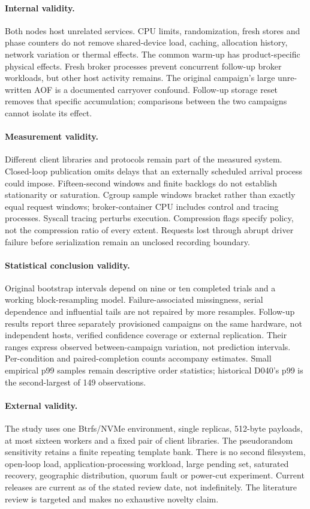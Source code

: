 \documentclass[11pt]{article}
\theoremstyle{definition}
\begin{document}
\paragraph{Internal validity.}
Both nodes host unrelated services. CPU limits, randomization, fresh stores and phase counters do not remove shared-device load, caching, allocation history, network variation or thermal effects. The common warm-up has product-specific physical effects. Fresh broker processes prevent concurrent follow-up broker workloads, but other host activity remains. The original campaign's large unre-written AOF is a documented carryover confound. Follow-up storage reset removes that specific accumulation; comparisons between the two campaigns cannot isolate its effect.

\paragraph{Measurement validity.}
Different client libraries and protocols remain part of the measured system. Closed-loop publication omits delays that an externally scheduled arrival process could impose. Fifteen-second windows and finite backlogs do not establish stationarity or saturation. Cgroup sample windows bracket rather than exactly equal request windows; broker-container CPU includes control and tracing processes. Syscall tracing perturbs execution. Compression flags specify policy, not the compression ratio of every extent. Requests lost through abrupt driver failure before serialization remain an unclosed recording boundary.

\paragraph{Statistical conclusion validity.}
Original bootstrap intervals depend on nine or ten completed trials and a working block-resampling model. Failure-associated missingness, serial dependence and influential tails are not repaired by more resamples. Follow-up results report three separately provisioned campaigns on the same hardware, not independent hosts, verified confidence coverage or external replication. Their ranges express observed between-campaign variation, not prediction intervals. Per-condition and paired-completion counts accompany estimates. Small empirical p99 samples remain descriptive order statistics; historical D040's p99 is the second-largest of 149 observations.

\paragraph{External validity.}
The study uses one Btrfs/NVMe environment, single replicas, 512-byte payloads, at most sixteen workers and a fixed pair of client libraries. The pseudorandom sensitivity retains a finite repeating template bank. There is no second filesystem, open-loop load, application-processing workload, large pending set, saturated recovery, geographic distribution, quorum fault or power-cut experiment. Current releases are current as of the stated review date, not indefinitely. The literature review is targeted and makes no exhaustive novelty claim.
\end{document}
